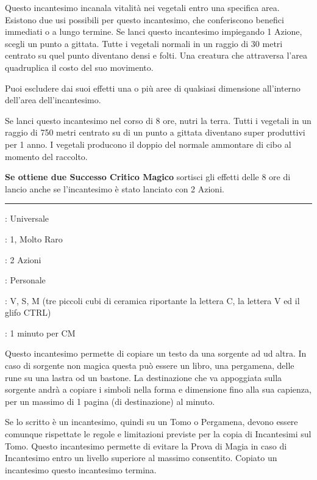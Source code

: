 \begin{multicols}{2}
Questo incantesimo incanala vitalità nei vegetali entro una specifica area. Esistono due usi possibili per questo incantesimo, che conferiscono benefici immediati o a lungo termine. Se lanci questo incantesimo impiegando 1 Azione, scegli un punto a gittata. Tutte i vegetali normali in un raggio di 30 metri centrato su quel punto diventano densi e folti. Una creatura che attraversa l'area quadruplica il costo del suo movimento.

Puoi escludere dai suoi effetti una o più aree di qualsiasi dimensione all'interno dell'area dell'incantesimo.

Se lanci questo incantesimo nel corso di 8 ore, nutri la terra. Tutti i vegetali in un raggio di 750 metri centrato su di un punto a gittata diventano super produttivi per 1 anno. I vegetali producono il doppio del normale ammontare di cibo al momento del raccolto.

\textbf{Se ottiene due Successo Critico Magico} sortisci gli effetti delle 8 ore di lancio anche se l'incantesimo è stato lanciato con 2 Azioni.

\smallskip\noindent\rule{\linewidth}{2pt} \hypertarget{CTRLC+CTRLV}{}\smallskip{}
\noindent
\begin{description}[noitemsep, topsep=0pt, parsep=0pt, partopsep=0pt, leftmargin=0cm, labelwidth=2.8cm]
	\item[\textbf{Lista di Magia}]: Universale
	\item[\textbf{Livello}]: 1, Molto Raro
	\item[\textbf{T. di Lancio}]: 2 Azioni
	\item[\textbf{Gittata}]: Personale
	\item[\textbf{Componenti}]: V, S, M (tre piccoli cubi di ceramica riportante la lettera C, la lettera V ed il glifo CTRL)
	\item[\textbf{Durata}]: 1 minuto per CM
\end{description}

Questo incantesimo permette di copiare un testo da una sorgente ad ud altra. In caso di sorgente non magica questa può essere un libro, una pergamena, delle rune su una lastra od un bastone. La destinazione che va appoggiata sulla sorgente andrà a copiare i simboli nella forma e dimensione fino alla sua capienza, per un massimo di 1 pagina (di destinazione) al minuto.

Se lo scritto è un incantesimo, quindi su un Tomo o Pergamena, devono essere comunque rispettate le regole e limitazioni previste per la copia di Incantesimi sul Tomo. Questo incantesimo permette di evitare la Prova di Magia in caso di Incantesimo entro un livello superiore al massimo consentito. Copiato un incantesimo questo incantesimo termina.


\end{multicols}
